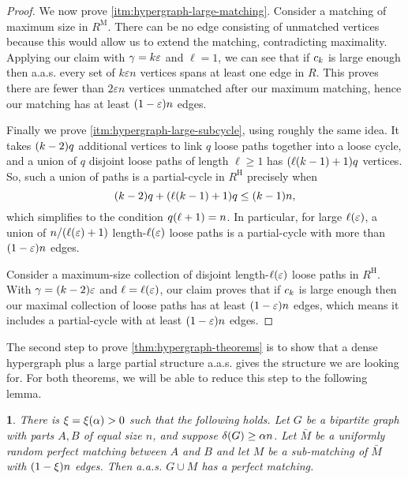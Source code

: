 \documentclass[11pt,english]{article}
\theoremstyle{plain}
\theoremstyle{definition}
\theoremstyle{definition}
\theoremstyle{plain}
\theoremstyle{plain}
\theoremstyle{plain}
\newtheorem{lem}[thm]{\protect\lemmaname}
\theoremstyle{plain}
\theoremstyle{remark}
\theoremstyle{remark}
\let\originalleft\left
\let\originalright\right
\renewcommand{\left}{\mathopen{}\mathclose\bgroup\originalleft}
\renewcommand{\right}{\aftergroup\egroup\originalright}
\providecommand{\lemmaname}{Lemma}
\begin{document}
\begin{proof}
We now prove \ref{itm:hypergraph-large-matching}. Consider a matching of maximum size in $R^{\mathrm{M}}$.
There can be no edge consisting of unmatched vertices because this would
allow us to extend the matching, contradicting maximality. Applying
our claim with $\gamma=k\varepsilon$ and $\ell=1$, we can see that
if $c_{k}$ is large enough then
a.a.s. every set of $k\varepsilon n$ vertices spans at least one
edge in $R$. This proves there are fewer than \emph{$2\varepsilon n$}
vertices unmatched after our maximum matching, hence our matching
has at least $\left(1-\varepsilon\right)n$ edges.

Finally we prove \ref{itm:hypergraph-large-subcycle}, using roughly the same idea. It takes $\left(k-2\right)q$ additional
vertices to link $q$ loose paths together into a loose cycle, and
a union of $q$ disjoint loose paths of length $\ell\ge1$ has $\left(\ell\left(k-1\right)+1\right)q$
vertices. So, such a union of paths is a partial-cycle in $R^{\mathrm{H}}$
precisely when 
\[
\left(k-2\right)q+\left(\ell\left(k-1\right)+1\right)q\le\left(k-1\right)n,
\]
which simplifies to the condition $q\left(\ell+1\right)=n$. In particular,
for large $\ell\left(\varepsilon\right)$, a union of $n/\left(\ell\left(\varepsilon\right)+1\right)$
length-$\ell\left(\varepsilon\right)$ loose paths is a partial-cycle
with more than $\left(1-\varepsilon\right)n$ edges.

Consider a maximum-size collection of disjoint length-$\ell\left(\varepsilon\right)$
loose paths in $R^{\mathrm{H}}$. With $\patheps=\left(k-2\right)\varepsilon$ and
$\ell=\ell\left(\varepsilon\right)$, our claim proves that if $c_{k}$ is large enough then our maximal
collection of loose paths has at least $\left(1-\varepsilon\right)n$
edges, which means it includes a partial-cycle with at least $\left(1-\varepsilon\right)n$
edges.
\end{proof}
The second step to prove \ref{thm:hypergraph-theorems} is to show that a dense
hypergraph plus a large partial structure a.a.s. gives the structure
we are looking for. For both theorems, we will be able to reduce this
step to the following lemma.
\begin{lem}
\label{lem:bipartite-plus-big-matching-perfect}There is $\xi=\xi\left(\alpha\right)>0$ 
such that the following holds. Let $G$ be a bipartite graph with
parts $A,B$ of equal size $n$, and suppose $\delta\left(G\right)\ge\alpha n$.
Let $\bar{M}$ be a uniformly random perfect matching between $A$
and $B$ and let $M$ be a sub-matching of $\bar{M}$ with $\left(1-\xi\right) n$
edges. Then a.a.s. $G\cup M$ has a perfect matching. 
\end{lem}
\end{document}
